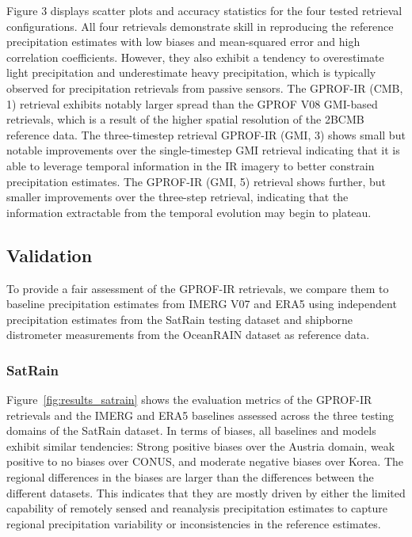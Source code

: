 \documentclass{ametsocV6.1}
\begin{document}
Figure 3 displays scatter plots and accuracy statistics for the four tested
retrieval configurations. All four retrievals demonstrate skill in reproducing
the reference precipitation estimates with low biases and mean-squared error and
high correlation coefficients. However, they also exhibit a tendency to
overestimate light precipitation and underestimate heavy precipitation, which
is typically observed for precipitation retrievals from passive sensors. The GPROF-IR (CMB, 1)
retrieval exhibits notably larger spread than the GPROF V08 GMI-based
retrievals, which is a result of the higher spatial resolution of the 2BCMB
reference data. The three-timestep retrieval GPROF-IR (GMI, 3) shows small but
notable improvements over the single-timestep GMI retrieval indicating that it
is able to leverage temporal information in the IR imagery to better constrain
precipitation estimates. The GPROF-IR (GMI, 5) retrieval shows further, but
smaller improvements over the three-step retrieval, indicating that the
information extractable from the temporal evolution may begin to plateau.

\subsection{Validation}

To provide a fair assessment of the GPROF-IR retrievals, we compare them
to baseline precipitation estimates from IMERG V07 and ERA5 using independent
precipitation estimates from the SatRain testing dataset and shipborne
distrometer measurements from the OceanRAIN dataset as reference data.

\subsubsection{SatRain}

Figure~\ref{fig:results_satrain} shows the evaluation metrics of the GPROF-IR
retrievals and the IMERG and ERA5 baselines assessed across the three testing
domains of the SatRain dataset. In terms of biases, all baselines and models
exhibit similar tendencies: Strong positive biases over the Austria domain, weak
positive to no biases over CONUS, and moderate negative biases over Korea. The
regional differences in the biases are larger than the differences between the
different datasets. This indicates that they are mostly driven by either the
limited capability of remotely sensed and reanalysis precipitation estimates to
capture regional precipitation variability or inconsistencies in the reference
estimates.
\end{document}
